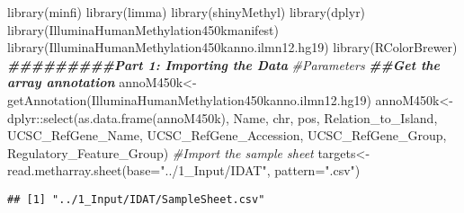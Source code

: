 \documentclass[
  10pt,
]{article}
\newenvironment{Shaded}{\begin{snugshade}}{\end{snugshade}}
\newcommand{\AttributeTok}[1]{\textcolor[rgb]{0.77,0.63,0.00}{#1}}
\newcommand{\CommentTok}[1]{\textcolor[rgb]{0.56,0.35,0.01}{\textit{#1}}}
\newcommand{\DocumentationTok}[1]{\textcolor[rgb]{0.56,0.35,0.01}{\textbf{\textit{#1}}}}
\newcommand{\FunctionTok}[1]{\textcolor[rgb]{0.00,0.00,0.00}{#1}}
\newcommand{\NormalTok}[1]{#1}
\newcommand{\OtherTok}[1]{\textcolor[rgb]{0.56,0.35,0.01}{#1}}
\newcommand{\SpecialCharTok}[1]{\textcolor[rgb]{0.00,0.00,0.00}{#1}}
\newcommand{\StringTok}[1]{\textcolor[rgb]{0.31,0.60,0.02}{#1}}
\begin{document}
\begin{Shaded}
\begin{Highlighting}[]
\FunctionTok{library}\NormalTok{(minfi)}
\FunctionTok{library}\NormalTok{(limma)}
\FunctionTok{library}\NormalTok{(shinyMethyl)}
\FunctionTok{library}\NormalTok{(dplyr)}
\FunctionTok{library}\NormalTok{(IlluminaHumanMethylation450kmanifest)}
\FunctionTok{library}\NormalTok{(IlluminaHumanMethylation450kanno.ilmn12.hg19)}
\FunctionTok{library}\NormalTok{(RColorBrewer)}
\DocumentationTok{\#\#\#\#\#\#\#\#\#Part 1: Importing the Data}
\CommentTok{\#Parameters}
\DocumentationTok{\#\#Get the array annotation}
\NormalTok{annoM450k}\OtherTok{\textless{}{-}}\FunctionTok{getAnnotation}\NormalTok{(IlluminaHumanMethylation450kanno.ilmn12.hg19)}
\NormalTok{annoM450k}\OtherTok{\textless{}{-}}\NormalTok{dplyr}\SpecialCharTok{::}\FunctionTok{select}\NormalTok{(}\FunctionTok{as.data.frame}\NormalTok{(annoM450k), Name, chr, pos, Relation\_to\_Island, UCSC\_RefGene\_Name, UCSC\_RefGene\_Accession, UCSC\_RefGene\_Group, Regulatory\_Feature\_Group)}
\CommentTok{\#Import the sample sheet}
\NormalTok{targets}\OtherTok{\textless{}{-}}\FunctionTok{read.metharray.sheet}\NormalTok{(}\AttributeTok{base=}\StringTok{"../1\_Input/IDAT"}\NormalTok{, }\AttributeTok{pattern=}\StringTok{".csv"}\NormalTok{)}
\end{Highlighting}
\end{Shaded}

\begin{verbatim}
## [1] "../1_Input/IDAT/SampleSheet.csv"
\end{verbatim}
\end{document}
